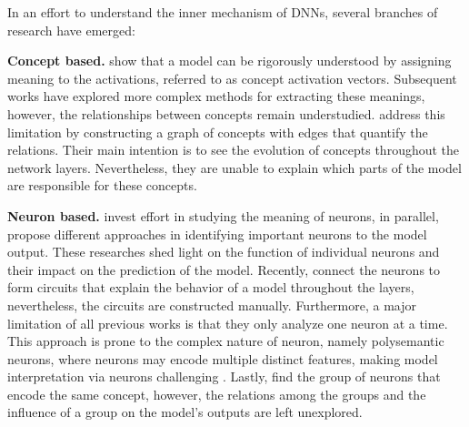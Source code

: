 In an effort to understand the inner mechanism of DNNs, several branches of research have emerged:

\textbf{Concept based.} \citet{CAV} show that a model can be rigorously understood by assigning meaning to the activations, referred to as concept activation vectors. Subsequent works \citep{ACE, NMF} have explored more complex methods for extracting these meanings, however, the relationships between concepts remain understudied. \citet{CRAFT, VCC} address this limitation by constructing a graph of concepts with edges that quantify the relations. Their main intention is to see the evolution of concepts throughout the network layers. Nevertheless, they are unable to explain which parts of the model are responsible for these concepts.


\textbf{Neuron based.} \citet{Multifaceted, mu2020compositional, Polysemantic, Invert} invest effort in studying the meaning of neurons, in parallel, \citet{NEUCEPT, neuron_shapley, critical_pathway} propose different approaches in identifying important neurons to the model output. These researches shed light on the function of individual neurons and their impact on the prediction of the model. Recently, \citep{Olah, Invert, concept_relevance_propagation} connect the neurons to form circuits that explain the behavior of a model throughout the layers, nevertheless, the circuits are constructed manually. Furthermore, a major limitation of all previous works is that they only analyze one neuron at a time. This approach is prone to the complex nature of neuron, namely polysemantic neurons, where neurons may encode multiple distinct features, making model interpretation via neurons challenging \citep{Olah, Polysemantic}. Lastly, \citet{hint, falcon} find the group of neurons that encode the same concept, however, the relations among the groups and the influence of a group on the model's outputs are left unexplored.

